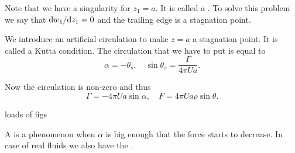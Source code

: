 \documentclass[../main.tex]{subfiles}
\begin{document}
  Note that we have a singularity for $z_1 = a$. 
  It is called a .
  To solve this problem we say that $\mathrm{d} w_1/ \mathrm{d} z_1 = 0$ and the trailing edge is a stagnation point.
  
  We introduce an artificial circulation to make $z = a$ a stagnation point.
  It is called a Kutta condition.
  The circulation that we have to put is equal to 
  \begin{displaymath}
    \alpha = - \theta_s, \quad \sin \theta_s = \frac{\Gamma}{4 \pi U a}.
  \end{displaymath}

  Now the circulation is non-zero and thus
  \begin{displaymath}
    \Gamma = -4\pi U a \sin \alpha, \quad F = 4 \pi U a \rho \sin \theta.
  \end{displaymath}
  
  \todo loads of figs
  
  A  is a phenomenon when $\alpha$ is big enough that the force starts to decrease.
  In case of real fluids we also have the .
  
\end{document}
